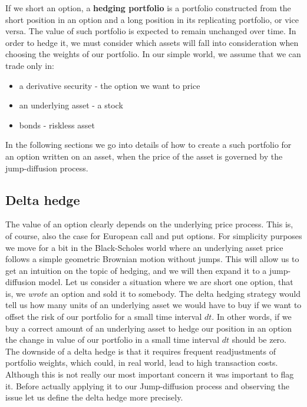\documentclass[times, utf8, diplomski]{fer}
\begin{document}
If we short an option, a \textbf{hedging portfolio} is a portfolio constructed from the short position in an option and a long position in its replicating portfolio, or vice versa. The value of such portfolio is expected to remain unchanged over time. In order to hedge it, we must consider which assets will fall into consideration when choosing the weights of our portfolio. In our simple world, we assume that we can trade only in:
\begin{itemize}
	\item a derivative security - the option we want to price
	\item an underlying asset - a stock
	\item bonds - riskless asset
\end{itemize}
\noindent In the following sections we go into details of how to create a such portfolio for an option written on an asset, when the price of the asset is governed by the jump-diffusion process.

\subsection{Delta hedge} \label{sec:delta_hedge}
The value of an option clearly depends on the underlying price process. This is, of course, also the case for European call and put options. For simplicity purposes we move for a bit in the Black-Scholes world where an underlying asset price follows a simple geometric Brownian motion without jumps. This will allow us to get an intuition on the topic of hedging, and we will then expand it to a jump-diffusion model. 
Let us consider a situation where we are short one option, that is, we \textit{wrote} an option and sold it to somebody. The delta hedging strategy would tell us how many units of an underlying asset we would have to buy if we want to offset the risk of our portfolio for a small time interval $dt$. In other words, if we buy a correct amount of an underlying asset to hedge our position in an option the change in value of our portfolio in a small time interval $dt$ should be zero. The downside of a delta hedge is that it requires frequent readjustments of portfolio weights, which could, in real world, lead to high transaction costs. Although this is not really our most important concern it was important to flag it. Before actually applying it to our Jump-diffusion process and observing the issue let us define the delta hedge more precisely.
\end{document}
